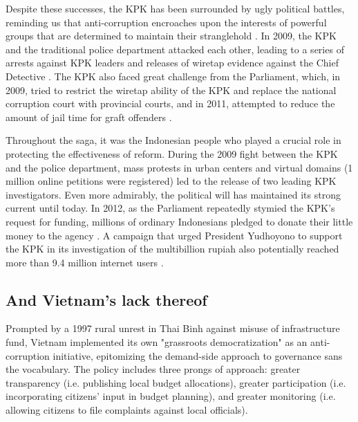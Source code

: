 \documentclass[12pt]{article}
\begin{document}
Despite these successes, the KPK has been surrounded by ugly political battles, reminding us that anti-corruption encroaches upon the interests of powerful groups that are determined to maintain their stranglehold \citep{Kimura2011}. In 2009, the KPK and the traditional police department attacked each other, leading to a series of arrests against KPK leaders and releases of wiretap evidence against the Chief Detective \citep{Luebke2012}. The KPK also faced great challenge from the Parliament, which, in 2009, tried to restrict the wiretap ability of the KPK and replace the national corruption court with provincial courts, and in 2011, attempted to reduce the amount of jail time for graft offenders \citep{TransparencyInternational2011}.

Throughout the saga, it was the Indonesian people who played a crucial role in protecting the effectiveness of reform. During the 2009 fight between the KPK and the police department, mass protests in urban centers and virtual domains (1 million online petitions were registered) led to the release of two leading KPK investigators. Even more admirably, the political will has maintained its strong current until today. In 2012, as the Parliament repeatedly stymied the KPK's request for funding, millions of ordinary Indonesians pledged to donate their little money to the agency \citep{Jaaffar2012}. A campaign that urged President Yudhoyono to support the KPK in its investigation of the multibillion rupiah also potentially reached more than 9.4 million internet users \citep{Mahditama2012}.

\subsection{And Vietnam's lack thereof}
\label{sec:Vietnam}

Prompted by a 1997 rural unrest in Thai Binh against misuse of infrastructure fund, Vietnam implemented its own "grassroots democratization" as an anti-corruption initiative, epitomizing the demand-side approach to governance sans the vocabulary. The policy includes three prongs of approach: greater transparency (i.e. publishing local budget allocations), greater participation (i.e. incorporating citizens' input in budget planning), and greater monitoring (i.e. allowing citizens to file complaints against local officials).
\end{document}
